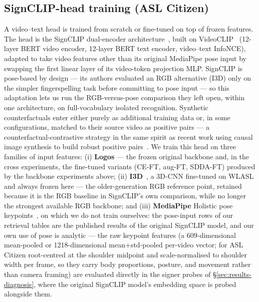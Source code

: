 \subsection{SignCLIP-head training (ASL Citizen)}
A video--text head is trained from scratch or fine-tuned on top of
frozen features. The head is the SignCLIP dual-encoder
architecture~\cite{jiangSignCLIPConnectingText2024}, built on
VideoCLIP~\cite{xuVideoCLIPContrastivePretraining2021} (12-layer BERT
video encoder, 12-layer BERT text encoder, video--text InfoNCE),
adapted to take video features other than its original MediaPipe pose
input by swapping the first linear layer of its video-token projection
MLP. SignCLIP is pose-based by design --- its authors evaluated an RGB
alternative (I3D) only on the simpler fingerspelling task before
committing to pose input --- so this adaptation lets us run the
RGB-versus-pose comparison they left open, within one architecture, on
full-vocabulary isolated recognition. Synthetic counterfactuals enter
either purely as additional training data or, in some configurations,
matched to their source video as positive pairs --- a
counterfactual-contrastive strategy in the same spirit as recent work
using causal image synthesis to build robust positive
pairs~\cite{roschewitzCounterfactualContrastiveLearning2025}.
We train this head on three families of input features:
(i) \textbf{Logos} --- the frozen original backbone and, in the cross
experiments, the fine-tuned variants (CE-FT, aug-FT, SDDA-FT) produced
by the backbone experiments above; (ii)
\textbf{I3D}~\cite{carreiraQuoVadisAction2017}, a 3D-CNN fine-tuned on
WLASL and always frozen here --- the older-generation RGB reference
point, retained because it is the RGB baseline in SignCLIP's own
comparison, while no longer the strongest available RGB backbone; and
(iii) \textbf{MediaPipe} Holistic pose
keypoints~\cite{lugaresiMediaPipeFrameworkBuilding2019}, on which we do
not train ourselves: the pose-input rows of our retrieval tables are the
published results of the original SignCLIP model, and our own use of
pose is analytic --- the raw keypoint features (a 609-dimensional
mean-pooled or 1218-dimensional mean+std-pooled per-video vector; for
ASL Citizen root-centred at the shoulder midpoint and scale-normalised
to shoulder width per frame, so they carry body proportions, posture,
and movement rather than camera framing) are evaluated directly in the
signer probes of \S\ref{sec:results-diagnosis}, where the original
SignCLIP model's embedding space is probed alongside them.

